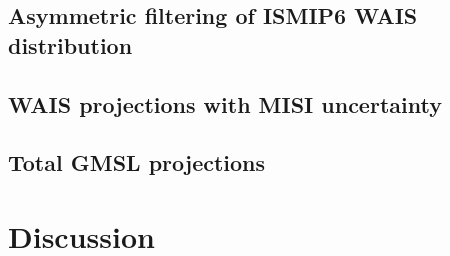 \documentclass[11pt]{article}
\begin{document}
\subsection{Asymmetric filtering of ISMIP6 WAIS distribution}
%
%

\subsection{WAIS projections with MISI uncertainty}
%
%
%

\subsection{Total GMSL projections}
%
%
%


\section{Discussion}
\label{sec:discussion}
\end{document}
